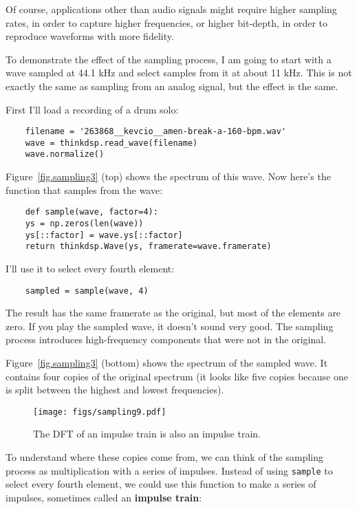 Of course, applications other than audio signals might require higher
sampling rates, in order to capture higher frequencies, or higher
bit-depth, in order to reproduce waveforms with more fidelity.


To demonstrate the effect of the sampling process, I am going to start
with a wave sampled at 44.1 kHz and select samples from it at about 11 kHz.
This is not exactly the same as sampling from an analog signal, but
the effect is the same.

First I'll load a recording of a drum solo:

\begin{verbatim}
	filename = '263868__kevcio__amen-break-a-160-bpm.wav'
	wave = thinkdsp.read_wave(filename)
	wave.normalize()
\end{verbatim}

Figure~\ref{fig.sampling3} (top) shows the spectrum of this wave.
Now here's the function that samples from the wave:

\begin{verbatim}
	def sample(wave, factor=4):
	ys = np.zeros(len(wave))
	ys[::factor] = wave.ys[::factor]
	return thinkdsp.Wave(ys, framerate=wave.framerate)
\end{verbatim}

I'll use it to select every fourth element:

\begin{verbatim}
	sampled = sample(wave, 4)
\end{verbatim}

The result has the same framerate as  the original, but most of the
elements are zero.  If you play the sampled wave, it doesn't sound
very good.  The sampling process introduces high-frequency
components that were not in the original.

Figure~\ref{fig.sampling3} (bottom) shows the spectrum of the sampled
wave.  It contains four copies of the original spectrum (it looks like
five copies because one is split between the highest and lowest
frequencies).

\begin{figure}
	\centerline{\texttt{[image: figs/sampling9.pdf]}}
	\caption{The DFT of an impulse train is also an impulse train.}
	\label{fig.sampling9}
\end{figure}

To understand where these copies come from, we can think of the
sampling process as multiplication with a series of impulses.  Instead
of using {\tt sample} to select every fourth element, we could use
this function to make a series of impulses, sometimes called an
{\bf impulse train}:

